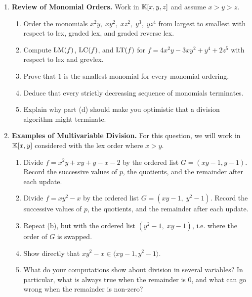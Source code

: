 \documentclass[12pt,reqno]{amsart}
\begin{document}
\hrulefill

\begin{enumerate}[leftmargin=*]
\item \textbf{Review of Monomial Orders.} Work in $\mathbb{K}[x,y,z]$ and assume $x>y>z$.
\begin{enumerate}[label=(\alph*),ref=\theenumi\alph*]
    \item Order the monomials $x^2y,\; xy^2,\; xz^2,\; y^3,\; yz^4$ from largest to smallest with respect to lex, graded lex, and graded reverse lex. 

    \item Compute $\operatorname{LM}(f)$, $\operatorname{LC}(f)$, and $\operatorname{LT}(f)$ for $f=4x^2y-3xy^2+y^4+2z^5$ with respect to lex and grevlex. 

    \item Prove that $1$ is the smallest monomial for every monomial ordering.
    
    \item Deduce that every strictly decreasing sequence of monomials terminates.
    
    \item Explain why part (d) should make you optimistic that a division algorithm might terminate.
\end{enumerate}

\item \textbf{Examples of Multivariable Division.} For this question, we will work in $\mathbb{K}[x,y]$ considered with the lex order where $x>y$.
\begin{enumerate}[label=(\alph*),ref=\theenumi\alph*]
    \item Divide $f=x^2y+xy+y-x-2$ by the ordered list $G=(xy-1, y-1)$. Record the successive values of $p$, the quotients, and the remainder after each update.
    
    \item Divide $f=xy^2-x$ by the ordered list $G=(xy-1,\; y^2-1)$. Record the successive values of $p$, the quotients, and the remainder after each update. 

    \item Repeat (b), but with the ordered list $(y^2-1,\; xy-1)$, i.e. where the order of $G$ is swapped. 
    
    \item Show directly that $xy^2-x\in \langle xy-1, y^2-1\rangle$. 
    
    \item What do your computations show about division in several variables? In particular, what is always true when the remainder is $0$, and what can go wrong when the remainder is non-zero? 
\end{enumerate}


\end{enumerate}
\end{document}
